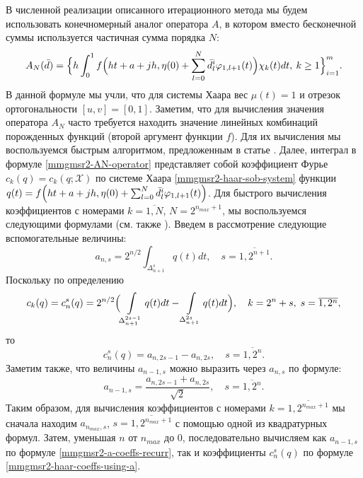 В численной реализации описанного итерационного метода мы будем использовать конечномерный аналог оператора $A$, в котором вместо бесконечной суммы используется частичная сумма порядка $N$:
\begin{equation}\label{mmgmsr2-AN-operator}
A_N(\bar{d})=
\Bigl\{
h\int_{0}^{1}f\Bigl(ht + a + jh,\eta(0)+ \sum_{l=0}^N \bar{d}^i_l \varphi_{1,l+1}(t)\Bigr)\chi_{k}(t)dt,
\: k \ge 1
\Bigr\}_{i=1}^m.
\end{equation}
В данной формуле мы учли, что для системы Хаара вес $\mu(t)=1$ и отрезок ортогональности $[u,v]=[0,1]$. Заметим, что для вычисления значения оператора $A_N$ часто требуется находить значение линейных комбинаций порожденных функций (второй аргумент функции $f$). Для их вычисления мы воспользуемся быстрым алгоритмом, предложенным в статье \cite{mmgmsr2-bib-haar-fast-calc}. Далее, интеграл в формуле \eqref{mmgmsr2-AN-operator} представляет собой коэффициент Фурье $c_k(q)=c_k(q; \mathcal{X})$ по системе Хаара \eqref{mmgmsr2-haar-sob-system} функции $q(t)=f\Bigl(ht + a + jh,\eta(0)+ \sum_{l=0}^N \bar{d}^i_l \varphi_{1,l+1}(t)\Bigr)$. Для быстрого вычисления коэффициентов с номерами $k=\overline{1,N}$, $N=2^{n_{max}+1}$, мы воспользуемся следующими формулами (см. также \cite[c. 47]{mmgmsr2-bib-farcov}). Введем в рассмотрение следующие вспомогательные величины:
\begin{equation}\label{mmgmsr2-a-coeffs}
a_{n,s} = 2^{n/2} \int_{\Delta^s_{n+1}} q(t)dt, \quad s = \overline{1,2^{n+1}}.
\end{equation}
Поскольку по определению
\begin{equation*}
c_k(q)=c_n^s(q)=2^{n/2}\Bigl(
\int\limits_{\Delta_{n+1}^{2s-1}}q(t)dt-
\int\limits_{\Delta_{n+1}^{2s}}q(t)dt
\Bigr), \quad k=2^n+s, \; s=\overline{1,2^n},
\end{equation*}
то
\begin{equation}\label{mmgmsr2-haar-coeffs-using-a}
c_n^s(q)=a_{n,2s-1}-a_{n,2s},
\quad s = \overline{1,2^{n}}.
\end{equation}
Заметим также, что величины $a_{n-1,s}$ можно выразить через $a_{n,s}$ по формуле:
\begin{equation}\label{mmgmsr2-a-coeffs-recurr}
a_{n-1,s}=\frac{a_{n,2s-1}+a_{n,2s}}{\sqrt{2}},
\quad s = \overline{1,2^{n}}.
\end{equation}
Таким образом, для вычисления коэффициентов с номерами $k=\overline{1,2^{n_{max}+1}}$ мы сначала находим $a_{n_{max},s}$, $s=\overline{1,2^{n_{max}+1}}$ с помощью одной из квадратурных формул. Затем, уменьшая $n$ от $n_{max}$ до $0$, последовательно вычисляем как $a_{n-1,s}$ по формуле \eqref{mmgmsr2-a-coeffs-recurr}, так и коэффициенты $c_n^s(q)$ по формуле \eqref{mmgmsr2-haar-coeffs-using-a}.

